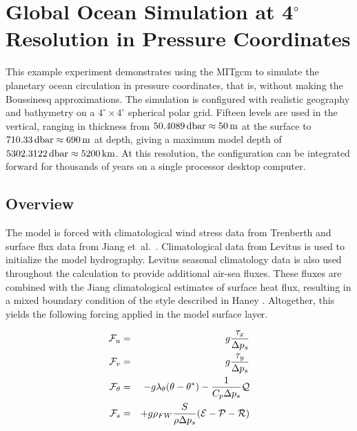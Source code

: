 
\section[P coordinate Global Ocean MITgcm Example]{Global Ocean Simulation at 4$^\circ$ Resolution in Pressure
  Coordinates}
\label{www:tutorials}
\label{sect:eg-globalpressure}


This example experiment demonstrates using the MITgcm to simulate the
planetary ocean circulation in pressure coordinates, that is, without
making the Boussinesq approximations. The simulation is configured
with realistic geography and bathymetry on a $4^{\circ} \times
4^{\circ}$ spherical polar grid.  Fifteen levels are used in the
vertical, ranging in thickness from
$50.4089\mbox{\,dbar}\approx50\mbox{\,m}$ at the surface to
$710.33\mbox{\,dbar}\approx690\mbox{\,m}$ at depth, giving a maximum
model depth of $5302.3122\mbox{\,dbar}\approx5200\mbox{\,km}$.  At
this resolution, the configuration can be integrated forward for
thousands of years on a single processor desktop computer.


\subsection{Overview}
\label{www:tutorials}

The model is forced with climatological wind stress data from
Trenberth \cite{trenberth90} and surface flux data from Jiang et~al.\ 
\cite{jiang99}. Climatological data from Levitus \cite{Levitus94} is
used to initialize the model hydrography.  Levitus seasonal
climatology data is also used throughout the calculation to provide
additional air-sea fluxes.  These fluxes are combined with the Jiang
climatological estimates of surface heat flux, resulting in a mixed
boundary condition of the style described in Haney \cite{Haney}.
Altogether, this yields the following forcing applied in the model
surface layer.

\begin{eqnarray}
\label{EQ:eg-global_forcing_pcoord}
\label{EQ:eg-global_forcing_fu_pcoord}
{\cal F}_{u} & = & g\frac{\tau_{x}}{\Delta p_{s}}
\\
\label{EQ:eg-global_forcing_fv_pcoord}
{\cal F}_{v} & = & g\frac{\tau_{y}}{\Delta p_{s}}
\\
\label{EQ:eg-global_forcing_ft_pcoord}
{\cal F}_{\theta} & = & - g\lambda_{\theta} ( \theta - \theta^{\ast} ) 
 - \frac{1}{C_{p} \Delta p_{s}}{\cal Q}
\\
\label{EQ:eg-global_forcing_fs_pcoord}
{\cal F}_{s} & = &
 + g\rho_{FW}\frac{S}{\rho\Delta p_{s}}({\cal E} - {\cal P} - {\cal R})
\end{eqnarray}

